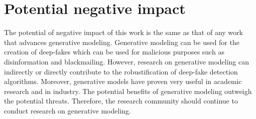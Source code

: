 \section{Potential negative impact}
The potential of negative impact of this work is the same as that of any work that advances generative modeling. Generative modeling can be used for the creation of deep-fakes which can be used for malicious purposes such as disinformation and blackmailing. However, research on generative modeling can indirectly or directly contribute to the robustification of deep-fake detection algorithms. Moreover, generative models have proven very useful in academic research and in industry. The potential benefits of generative modeling outweigh the potential threats. Therefore, the research community should continue to conduct research on generative modeling.